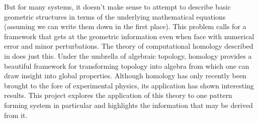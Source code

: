 	But for many systems, it doesn't make sense to attempt to describe basic geometric structures in terms of the underlying mathematical equations (assuming we can write them down in the first place). This problem calls for a framework that gets at the geometric information even when face with numerical error and minor perturbations. The theory of computational homology described in  does just this. Under the umbrella of algebraic topology, homology provides a beautiful framework for transforming topology into algebra from which one can draw insight into global properties. Although homology has only recently been brought to the fore of experimental physics, its application has shown interesting results. This project explores the application of this theory to one pattern forming system in particular and highlights the information that may be derived from it.